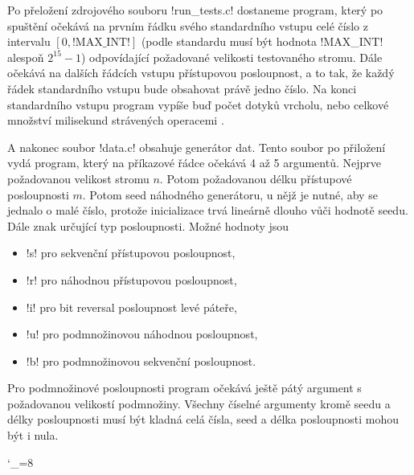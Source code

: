 Po přeložení zdrojového souboru !run_tests.c! dostaneme program, který po
spuštění očekává na prvním řádku svého standardního vstupu celé číslo z
intervalu $[0, \text{!MAX_INT!}]$ (podle standardu musí být hodnota !MAX_INT!
alespoň $2^{15}-1$) odpovídající požadované velikosti testovaného stromu. Dále
očekává na dalších řádcích vstupu přístupovou posloupnost, a to tak, že každý
řádek standardního vstupu bude obsahovat právě jedno číslo. Na konci
standardního vstupu program vypíše buď počet dotyků vrcholu, nebo celkové
množství milisekund strávených operacemi .

A nakonec soubor !data.c! obsahuje generátor dat. Tento soubor po přiložení vydá program, který na příkazové řádce očekává 4 až 5 argumentů. Nejprve požadovanou velikost stromu $n$. Potom požadovanou délku přístupové posloupnosti $m$. Potom seed náhodného generátoru, u nějž je nutné, aby se jednalo o malé číslo, protože inicializace trvá lineárně dlouho vůči hodnotě seedu. Dále znak určující typ posloupnosti. Možné hodnoty jsou

\begin{itemize}
\item !s! pro sekvenční přístupovou posloupnost,
\item !r! pro náhodnou přístupovou posloupnost,
\item !i! pro bit reversal posloupnost levé páteře,
\item !u! pro podmnožinovou náhodnou posloupnost,
\item !b! pro podmnožinovou sekvenční posloupnost.
\end{itemize}

Pro podmnožinové posloupnosti program očekává ještě pátý argument s požadovanou velikostí podmnožiny. Všechny číselné argumenty kromě seedu a délky posloupnosti musí být kladná celá čísla, seed a délka posloupnosti mohou být i nula.

\catcode`_=8
